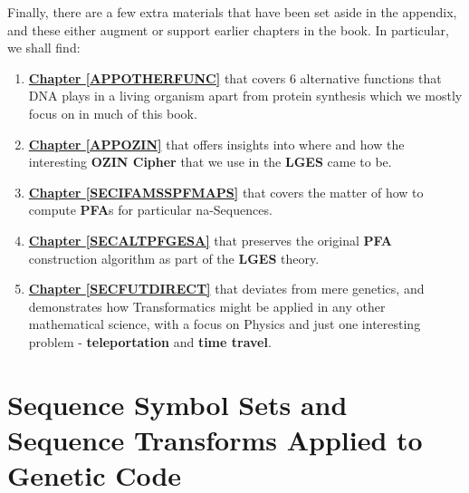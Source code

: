 \documentclass[a4paper, 18pt]{book} %
\begin{document}
Finally, there are a few extra materials that have been set aside in the appendix, and these either augment or support earlier chapters in the book. In particular, we shall find:

\begin{enumerate}
\item \textbf{\hyperref[APPOTHERFUNC]{Chapter \ref{APPOTHERFUNC}}} that covers 6 alternative functions that DNA plays in a living organism apart from protein synthesis which we mostly focus on in much of this book.

\item \textbf{\hyperref[APPOZIN]{Chapter \ref{APPOZIN}}} that offers insights into where and how the interesting \textbf{OZIN Cipher} that we use in the \textbf{LGES} came to be.

\item \textbf{\hyperref[SECIFAMSSPFMAPS]{Chapter \ref{SECIFAMSSPFMAPS}}} that covers the matter of how to compute \textbf{PFA}s for particular na-Sequences.

\item \textbf{\hyperref[SECALTPFGESA]{Chapter \ref{SECALTPFGESA}}} that preserves the original \textbf{PFA} construction algorithm as part of the \textbf{LGES} theory.

\item \textbf{\hyperref[SECFUTDIRECT]{Chapter \ref{SECFUTDIRECT}}} that deviates from mere genetics, and demonstrates how Transformatics might be applied in any other mathematical science, with a focus on Physics and just one interesting problem - \textbf{teleportation} and \textbf{time travel}.

\end{enumerate}




\chapter{Sequence Symbol Sets and Sequence Transforms Applied to Genetic Code}
\label{SEC2}
\end{document}

